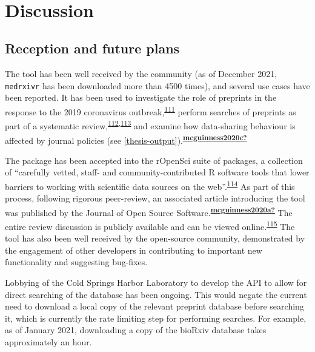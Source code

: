 \documentclass[a4paper, twoside]{templates/ociamthesis}
\begin{document}
~

\hypertarget{discussion}{%
\section{Discussion}\label{discussion}}

\hypertarget{reception-and-future-plans}{%
\subsection{Reception and future plans}\label{reception-and-future-plans}}

The tool has been well received by the community (as of December 2021, \texttt{medrxivr} has been downloaded more than 4500 times), and several use cases have been reported. It has been used to investigate the role of preprints in the response to the 2019 coronavirus outbreak,\textsuperscript{\protect\hyperlink{ref-kodvanj2020}{111}} perform searches of preprints as part of a systematic review,\textsuperscript{\protect\hyperlink{ref-noone2020}{112},\protect\hyperlink{ref-grassly2020}{113}} and examine how data-sharing behaviour is affected by journal policies (see \ref{thesis-output}).\textsuperscript{\protect\hyperlink{ref-mcguinness2020c}{\textbf{mcguinness2020c?}}}

The package has been accepted into the rOpenSci suite of packages, a collection of ``carefully vetted, staff- and community-contributed R software tools that lower barriers to working with scientific data sources on the web''.\textsuperscript{\protect\hyperlink{ref-boettiger2015}{114}} As part of this process, following rigorous peer-review, an associated article introducing the tool was published by the Journal of Open Source Software.\textsuperscript{\protect\hyperlink{ref-mcguinness2020a}{\textbf{mcguinness2020a?}}} The entire review discussion is publicly available and can be viewed online.\textsuperscript{\protect\hyperlink{ref-zotero-15016}{115}} The tool has also been well received by the open-source community, demonstrated by the engagement of other developers in contributing to important new functionality and suggesting bug-fixes.

Lobbying of the Cold Springs Harbor Laboratory to develop the API to allow for direct searching of the database has been ongoing. This would negate the current need to download a local copy of the relevant preprint database before searching it, which is currently the rate limiting step for performing searches. For example, as of January 2021, downloading a copy of the bioRxiv database takes approximately an hour.
\end{document}

